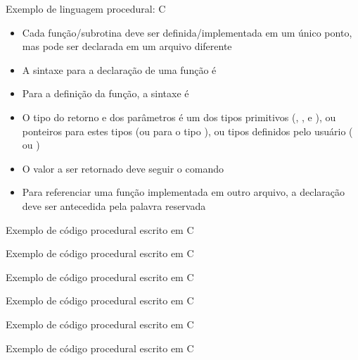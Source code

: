 \begin{frame}[fragile]{Exemplo de linguagem procedural: C}

    \begin{itemize}
        \item Cada função/subrotina deve ser definida/implementada em um único ponto, mas pode
            ser declarada em um arquivo diferente

        \item A sintaxe para a declaração de uma função é


        \item Para a definição da função, a sintaxe é

        \item O tipo do retorno e dos parâmetros é um dos tipos primitivos (,
            ,  e ), ou ponteiros para estes tipos
            (ou para o tipo ), ou tipos definidos pelo usuário ( ou
                )

        \item O valor a ser retornado deve seguir o comando 

        \item Para referenciar uma função implementada em outro arquivo, a declaração deve ser
            antecedida pela palavra reservada 
    \end{itemize}

\end{frame}

\begin{frame}[fragile]{Exemplo de código procedural escrito em C}
\end{frame}

\begin{frame}[fragile]{Exemplo de código procedural escrito em C}
\end{frame}

\begin{frame}[fragile]{Exemplo de código procedural escrito em C}
\end{frame}

\begin{frame}[fragile]{Exemplo de código procedural escrito em C}
\end{frame}

\begin{frame}[fragile]{Exemplo de código procedural escrito em C}
\end{frame}

\begin{frame}[fragile]{Exemplo de código procedural escrito em C}
\end{frame}
